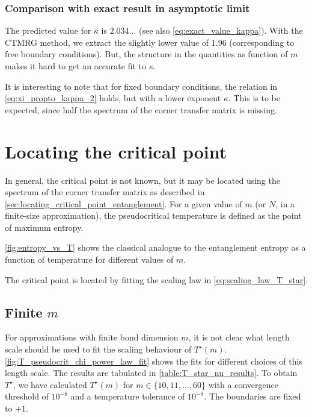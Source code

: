 \subsubsection{Comparison with exact result in asymptotic limit}

The predicted value for $\kappa$ \cite{pollmann2009theory} is $2.034\dots$ (see also \autoref{eq:exact_value_kappa}).
With the CTMRG method, we extract the slightly lower value of $1.96$ (corresponding to free boundary conditions).
But, the structure in the quantities as function of $m$ makes it hard to get an accurate fit to $\kappa$.

It is interesting to note that for fixed boundary conditions, the relation in \autoref{eq:xi_propto_kappa_2} holds,
but with a lower exponent $\kappa$.
This is to be expected, since half the spectrum of the corner transfer matrix is missing.

\section{Locating the critical point}\label{sec:locating_the_critical_point}

In general, the critical point is not known, but it may be located using the spectrum of the corner transfer matrix as
described in \autoref{sec:locating_critical_point_entanglement}. For a given value of $m$ (or $N$, in a finite-size approximation), the pseudocritical temperature is defined as the point of maximum entropy.

\autoref{fig:entropy_vs_T} shows the classical analogue to the entanglement entropy as a function of temperature for
different values of $m$.

The critical point is located by fitting the scaling law in \autoref{eq:scaling_law_T_star}.

\subsection{Finite $m$}
For approximations with finite bond dimension $m$,
it is not clear what length scale should be used to fit the scaling behaviour of $T^{\star}(m)$.
\autoref{fig:T_pseudocrit_chi_power_law_fit} shows the fits for different choices of this length scale.
The results are tabulated in \autoref{table:T_star_nu_results}.
To obtain $T^{\star}$, we have calculated $T^{\star}(m)$ for $m \in \{10,
11, \dots, 60\}$ with a convergence threshold of $10^{-8}$ and a temperature tolerance of $10^{-8}$.
The boundaries are fixed to $+1$.

